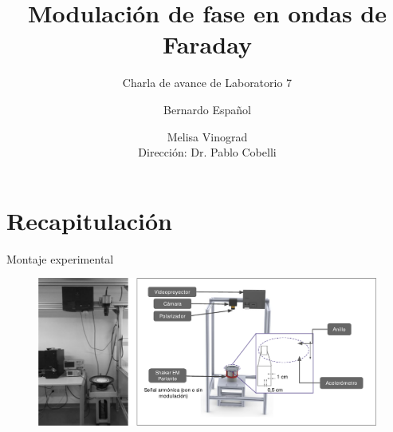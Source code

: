 \documentclass[aspectratio=169]{beamer}
\title{Modulación de fase en ondas de Faraday}
\subtitle{Charla de avance de Laboratorio 7}
\author{
	Bernardo Español \and Melisa Vinograd
	\texorpdfstring{\\ \vspace{0.1cm} Dirección: Dr. Pablo Cobelli}{}
}
\institute{Laboratorio de Turbulencia Geofísica, FLiP: Fluidos y Plasmas}
\date{}
\begin{document}
\begin{frame}
	\titlepage
\end{frame}

\section{Recapitulación}

\begin{frame}{Montaje experimental}
	\begin{figure}[ht]
		\centering
		\includegraphics[width=1\textwidth]{figs/esquema_experimental.pdf}
	\end{figure}
\end{frame}
\end{document}
